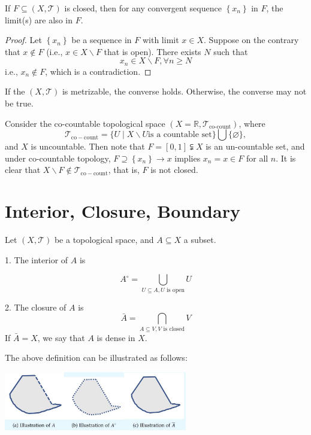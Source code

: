 \begin{proposition} If \(F \subseteq  \left({X,\mathcal{T}}\right)\) is closed, then for any convergent sequence \(\left\{  x_n\right\}\) in \(F\), the limit(s) are also in \(F\).
\end{proposition}
\begin{proof} Let \(\left\{  x_n\right\}\) be a sequence in \(F\) with limit \(x \in  X\). Suppose on the contrary that \(x \notin  F\) (i.e., \(x \in  X \smallsetminus  F\) that is open). There exists \(N\) such that
\[
x_n \in  X \smallsetminus  F,\forall n \geq  N
\]
i.e., \(x_n \notin  F\), which is a contradiction.
\end{proof}

If the $(X, \mathcal{T})$ is metrizable, the converse holds. Otherwise, the converse may not be true. 
\begin{example} Consider the co-countable topological space \(\left({X = \mathbb{R},{\mathcal{T}}_{\text{co-count}}}\right)\), where
\[
{\mathcal{T}}_{\mathrm{{co-count}}} = \{ U \mid  X \smallsetminus  U\text{is a countable set}\} \bigcup \{ \varnothing \},
\]
and \(X\) is uncountable. Then note that \(F = \left\lbrack  {0,1}\right\rbrack   \subsetneqq  X\) is an un-countable set, and under co-countable topology, \(F \supseteq  \left\{  x_n\right\}   \rightarrow  x\) implies \(x_n = x \in  F\) for all \(n\). It is clear that \(X \smallsetminus  F \notin  {\mathcal{T}}_{\mathrm{{co-count}}}\), that is, \(F\) is not closed.
\end{example}

\section{Interior, Closure, Boundary}
\begin{definition} \label{def:interior_closure} Let $(X, \mathcal{T})$ be a topological space, and \(A \subseteq  X\) a subset.

1. The interior of \(A\) is

\[
{A}^{ \circ } = \mathop{\bigcup}\limits_{{U \subseteq  A,U\text{ is open}}}U
\]

2. The closure of \(A\) is
\[
\bar{A} = \mathop{\bigcap}\limits_{{A \subseteq  V,V\text{ is closed}}}V
\]
If \(\bar{A} = X\), we say that \(A\) is dense in \(X\).
\end{definition}

The above definition can be illustrated as follows:
\begin{center}
\includegraphics[width=0.6\textwidth]{images/Ch2_interior_closure.jpg}
\end{center}

